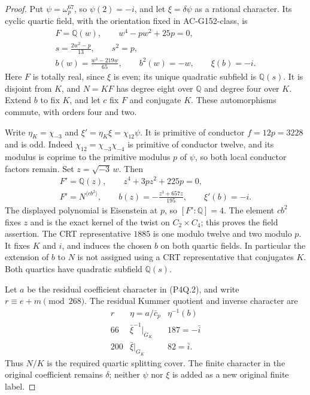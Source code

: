 \begin{proof}
Put $\psi=\omega_p^{67}$, so $\psi(2)=-i$, and let
$\xi=\delta\psi$ as a rational character.
Its cyclic quartic field, with the orientation fixed in
AC-G152-class, is
\[
 \begin{gathered}
 F=\mathbb Q(w),\qquad w^4-pw^2+25p=0,\\
 s=\frac{2w^2-p}{13},\qquad s^2=p,\\
 b(w)=\frac{w^3-219w}{65},\qquad b^2(w)=-w,
                           \qquad\xi(b)=-i.
 \end{gathered}
 \tag{P4Q.3}
\]
Here $F$ is totally real, since $\xi$ is even; its unique
quadratic subfield is $\mathbb Q(s)$.
It is disjoint from $K$, and $N=KF$ has degree eight over
$\mathbb Q$ and degree four over $K$.
Extend $b$ to fix $K$, and let $c$ fix $F$ and conjugate $K$.
These automorphisms commute, with orders four and two.

Write $\eta_K=\chi_{-3}$ and
$\xi'=\eta_K\xi=\chi_{12}\psi$.
It is primitive of conductor $f=12p=3228$ and is odd.
Indeed $\chi_{12}=\chi_{-3}\chi_{-4}$ is primitive of conductor
twelve, and its modulus is coprime to the primitive modulus $p$
of $\psi$, so both local conductor factors remain.
Set $z=\sqrt{-3}\,w$.  Then
\[
 \begin{gathered}
 F'=\mathbb Q(z),\qquad z^4+3pz^2+225p=0,\\
 F'=N^{\langle cb^2\rangle},\qquad
 b(z)=-\frac{z^3+657z}{195},\qquad\xi'(b)=-i.
 \end{gathered}
 \tag{P4Q.4}
\]
The displayed polynomial is Eisenstein at $p$, so $[F':\mathbb Q]=4$.
The element $cb^2$ fixes $z$ and is the exact kernel of the
twist on $C_2\times C_4$; this proves the field assertion.
The CRT representative $1885$ is one modulo twelve and two
modulo $p$.  It fixes $K$ and $i$, and induces the chosen $b$
on both quartic fields.  In particular the extension of $b$ to
$N$ is not assigned using a CRT representative that conjugates $K$.
Both quartics have quadratic subfield $\mathbb Q(s)$.

Let $a$ be the residual coefficient character in (P4Q.2), and
write $r\equiv e+m\pmod{268}$.
The residual Kummer quotient and inverse character are
\[
 \begin{array}{c|c|c}
 r&\eta=a/\bar c_p&\eta^{-1}(b)\\ \hline
 66&\bar\xi^{-1}|_{G_K}&187=-\bar i\\
 200&\bar\xi|_{G_K}&82=\bar i.
 \end{array}
 \tag{P4Q.5}
\]
Thus $N/K$ is the required quartic splitting cover.
The finite character in the original coefficient remains $\delta$;
neither $\psi$ nor $\xi$ is added as a new original finite label.


\end{proof}
